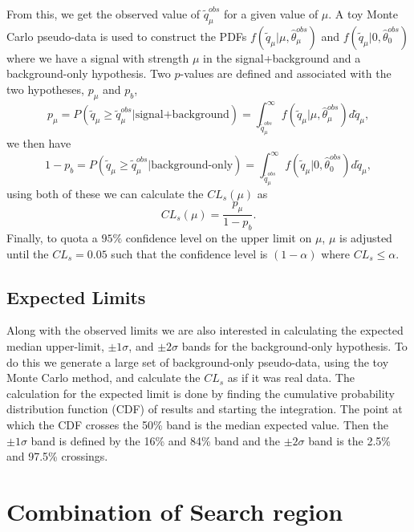 From this, we get the observed value of $\widetilde{q}_\mu^{obs}$ for a given value of $\mu$. A toy Monte Carlo pseudo-data is used to construct the PDFs $f(\widetilde{q}_\mu|\mu,\hat{\theta}_\mu^{obs})$ and $f(\widetilde{q}_\mu|0,\hat{\theta}_0^{obs})$ where we have a signal with strength $\mu$ in the signal+background and a background-only hypothesis. Two $p$-values are defined and associated with the two hypotheses, $p_\mu$ and $p_b$,
\begin{equation}\label{eqn:splusb}
p_\mu=P(\widetilde{q}_\mu\geq\widetilde{q}_\mu^{obs}|\text{signal+background})=\int_{\widetilde{q}_\mu^{obs}}^{\infty}f(\widetilde{q}_\mu|\mu,\hat{\theta}_\mu^{obs})d\widetilde{q}_\mu,
\end{equation} \label{eqn:b}
we then have
\begin{equation}
1-p_b=P(\widetilde{q}_\mu\geq\widetilde{q}_\mu^{obs}|\text{background-only})=\int_{\widetilde{q}_\mu^{obs}}^{\infty}f(\widetilde{q}_\mu|0,\hat{\theta}_0^{obs})d\widetilde{q}_\mu,
\end{equation}
using both of these we can calculate the $CL_s(\mu)$ as 
\begin{equation}
CL_s(\mu)=\frac{p_\mu}{1-p_b}.
\end{equation}
Finally, to quota a $95\%$ confidence level on the upper limit on $\mu$, $\mu$ is adjusted until the $CL_s=0.05$ such that the confidence level is $(1-\alpha)$ where $CL_s\leq\alpha$. 

\subsection{Expected Limits}\label{sec:ExpLimits}

Along with the observed limits we are also interested in calculating the expected median upper-limit, $\pm1\sigma$, and $\pm2\sigma$ bands for the background-only hypothesis. To do this we generate a large set of background-only pseudo-data, using the toy Monte Carlo method, and calculate the $CL_s$ as if it was real data. The calculation for the expected limit is done by finding the cumulative probability distribution function (CDF) of results and starting the integration. The point at which the CDF crosses the 50\% band is the median expected value. Then the $\pm1\sigma$ band is defined by the 16\% and 84\% band and the $\pm2\sigma$ band is the 2.5\% and 97.5\% crossings. 

\section{Combination of Search region}\label{sec:Combination}


